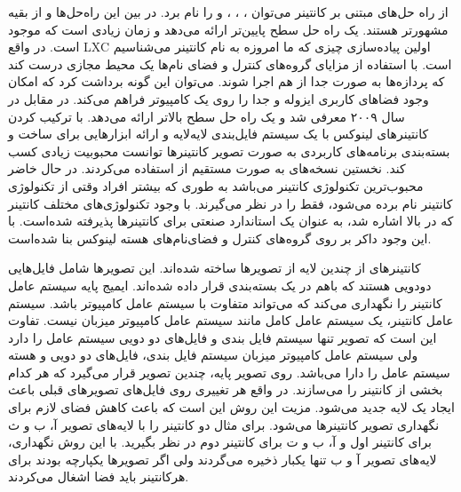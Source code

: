      از راه حل‌های مبتنی بر کانتینر می‌توان \cite{2019vserver}، \cite{2019openvz}، \cite{2019containers}، \cite{2019docker} و \cite{2019rtk} را نام برد.
      در بین این راه‌حل‌ها  و  از بقیه مشهورتر هستند.
       یک راه حل سطح پایین‌تر ارائه می‌دهد و زمان زیادی است که موجود است.
      در واقع LXC اولین پیاده‌سازی چیزی که ما امروزه به نام کانتینر می‌شناسیم است.
       با استفاده از مزایای گروه‌های کنترل و فضای نام‌ها یک محیط مجازی درست کند که پردازه‌ها به صورت جدا از هم اجرا شوند.
      می‌توان این گونه برداشت کرد که  امکان وجود فضا‌های کاربری ایزوله و جدا را روی یک کامپیوتر فراهم می‌کند.
      در مقابل  در سال ۲۰۰۹ معرفی شد و یک راه حل سطح بالاتر ارائه می‌دهد.
       با ترکیب کردن کانتینر‌های لینوکس با یک سیستم فایل‌بندی لایه‌لایه و ارائه ابزار‌هایی برای ساخت و بسته‌بندی برنامه‌های کاربردی به صورت تصویر کانتینر‌ها توانست محبوبیت زیادی کسب کند.
      نخستین نسخه‌های  به صورت مستقیم از  استفاده می‌کردند.
      در حال خاضر  محبوب‌ترین تکنولوژی کانتینر می‌باشد به طوری که بیشتر افراد وقتی از تکنولوژی کانتینر نام برده می‌شود، فقط  را در نظر می‌گیرند.
      با وجود تکنولوژی‌های مختلف کانتینر که در بالا اشاره شد،  به عنوان یک استاندارد صنعتی برای کانتینر‌ها پذیرفته شده‌است.
      با این وجود داکر بر روی گروه‌های کنترل و فضای‌نام‌های هسته لینوکس بنا شده‌است.

      کانتینر‌های  از چندین لایه از تصویر‌ها ساخته شده‌اند.
      این تصویر‌ها شامل فایل‌هایی دودویی هستند که باهم در یک بسته‌بندی قرار داده‌ شده‌اند.
      ایمیج پایه سیستم عامل کانتینر را نگهداری می‌کند که می‌تواند متفاوت با سیستم عامل کامپیوتر باشد.
      سیستم عامل کانتینر، یک سیستم عامل کامل مانند سیستم عامل کامپیوتر میزبان نیست.
      تفاوت این است که تصویر تنها سیستم فایل بندی و فایل‌های دو دویی سیستم عامل را دارد ولی سیستم عامل کامپیوتر میزبان سیستم فایل بندی، فایل‌های دو دویی و هسته سیستم عامل را دارا می‌باشد.
      روی تصویر پایه، چندین تصویر قرار می‌گیرد که هر کدام بخشی از کانتینر را می‌سازند.
      در واقع هر تغییری روی فایل‌های تصویر‌های قبلی باعث ایجاد یک لایه جدید می‌شود.
      مزیت این روش این است که باعث کاهش فضای لازم برای نگهداری تصویر کانتینر‌ها می‌شود.
      برای مثال دو کانتینر را با لایه‌های تصویر آ، ب و ث برای کانتینر اول و آ، ب و ت برای کانتینر دوم در نظر بگیرید.
      با این روش نگهداری، لایه‌های تصویر آ و ب تنها یکبار ذخیره می‌گردند ولی اگر تصویر‌ها یکپارچه بودند برای هرکانتینر باید فضا اشغال می‌کردند.

